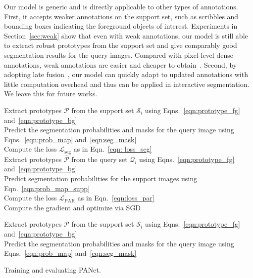 \documentclass[10pt,twocolumn,letterpaper]{article}
\begin{document}
Our model is generic and is directly applicable to other types of annotations. First, it accepts weaker annotations on the support set, such as scribbles and bounding boxes indicating the foreground objects of interest. Experiments in Section~\ref{sec:weak} show that even with weak annotations, our model is still able to extract robust prototypes from the support set and give comparably good segmentation results for the query images. Compared with pixel-level dense annotations, weak annotations are easier and cheaper to obtain~\cite{lin2016scribblesup}. Second, by adopting late fusion~\cite{rakelly2018few}, our model can quickly adapt to updated annotations with little computation overhead  and thus can be applied in interactive segmentation. We leave this for future works.

\begin{algorithm}[t]
\SetAlgoLined
\SetAlgoHangIndent{12pt}
{
Extract prototypes $\mathcal{P}$ from the support set $\mathcal{S}_i$ using Eqns.~\eqref{eqn:prototype_fg} and~\eqref{eqn:prototype_bg}\\
Predict the segmentation probabilities and masks for the query image using Eqns.~\eqref{eqn:prob_map} and~\eqref{eqn:seg_mask}\\
Compute the loss $\mathcal{L}_{\text{seg}}$ as in Eqn.~\eqref{eqn: loss_seg} \\
Extract prototypes $\bar{\mathcal{P}}$ from the query set $\mathcal{Q}_i$ using Eqns.~\eqref{eqn:prototype_fg} and~\eqref{eqn:prototype_bg} \\
Predict segmentation probabilities for the support images using Eqn.~\eqref{eqn:prob_map_supp} \\
Compute the loss $\mathcal{L}_{\text{PAR}}$ as in Eqn.~\eqref{eqn:loss_par}\\
Compute the gradient and optimize via SGD
}

{
Extract prototypes $\mathcal{P}$ from the support set $\mathcal{S}_i$ using Eqns.~\eqref{eqn:prototype_fg} and~\eqref{eqn:prototype_bg}\\
Predict the segmentation probabilities and masks for the query image using Eqns.~\eqref{eqn:prob_map} and~\eqref{eqn:seg_mask}
}

  \caption{Training and evaluating PANet.}\label{algo}
\end{algorithm}
\end{document}
